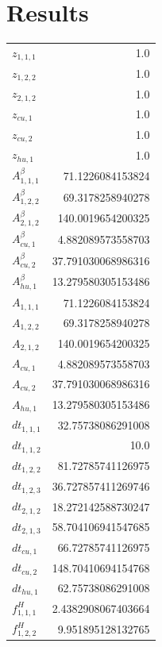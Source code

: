 \documentclass{article}%
\makeatletter
\let\mcnewpage=\newpage%
\newcommand{\TrickSupertabularIntoMulticols}{%
\renewcommand\newpage{%
\if@firstcolumn%
\hrule width\linewidth height0pt%
\columnbreak%
\else%
\mcnewpage%
\fi%
}%
}%
\makeatother
\begin{document}
\section{Results}%
\thispagestyle{plain}%
\begin{multicols*}{3}%
\TrickSupertabularIntoMulticols%
%
\begin{supertabular}{lr}%
	$z_{1,1,1}$ & 1.0 \\%
	$z_{1,2,2}$ & 1.0 \\%
	$z_{2,1,2}$ & 1.0 \\%
	$z_{cu,1}$ & 1.0 \\%
	$z_{cu,2}$ & 1.0 \\%
	$z_{hu,1}$ & 1.0 \\%
	$A_{1,1,1}^{\beta}$ & 71.1226084153824 \\%
	$A_{1,2,2}^{\beta}$ & 69.3178258940278 \\%
	$A_{2,1,2}^{\beta}$ & 140.0019654200325 \\%
	$A_{cu,1}^{\beta}$ & 4.882089573558703 \\%
	$A_{cu,2}^{\beta}$ & 37.791030068986316 \\%
	$A_{hu,1}^{\beta}$ & 13.279580305153486 \\%
	$A_{1,1,1}$ & 71.1226084153824 \\%
	$A_{1,2,2}$ & 69.3178258940278 \\%
	$A_{2,1,2}$ & 140.0019654200325 \\%
	$A_{cu,1}$ & 4.882089573558703 \\%
	$A_{cu,2}$ & 37.791030068986316 \\%
	$A_{hu,1}$ & 13.279580305153486 \\%
	$dt_{1,1,1}$ & 32.75738086291008 \\%
	$dt_{1,1,2}$ & 10.0 \\%
	$dt_{1,2,2}$ & 81.72785741126975 \\%
	$dt_{1,2,3}$ & 36.727857411269746 \\%
	$dt_{2,1,2}$ & 18.272142588730247 \\%
	$dt_{2,1,3}$ & 58.704106941547685 \\%
	$dt_{cu,1}$ & 66.72785741126975 \\%
	$dt_{cu,2}$ & 148.70410694154768 \\%
	$dt_{hu,1}$ & 62.75738086291008 \\%
	$f_{1,1,1}^{H}$ & 2.4382908067403664 \\%
	$f_{1,2,2}^{H}$ & 9.951895128132765 \\%

\end{supertabular}
\end{multicols*}
\end{document}
